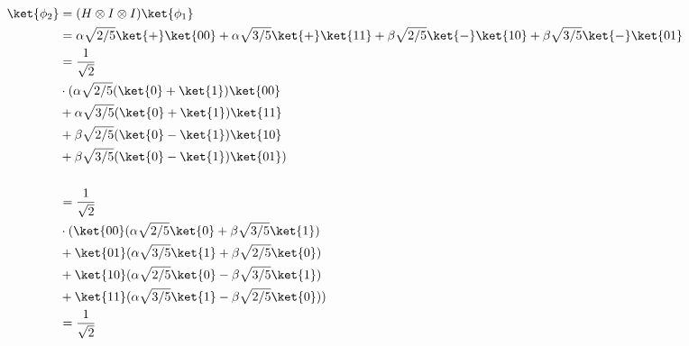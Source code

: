 \documentclass{article}
\begin{document}
\begin{enumerate}
        $$\begin{aligned}
            \ket{\phi_2} & =(H\otimes I\otimes I)\ket{\phi_1}                                                                                             \\
                         & =\alpha\sqrt{2/5}\ket{+}\ket{00}+\alpha\sqrt{3/5}\ket{+}\ket{11}+\beta\sqrt{2/5}\ket{-}\ket{10}+\beta\sqrt{3/5}\ket{-}\ket{01} \\
                         & =\frac{1}{\sqrt{2}}                                                                                                            \\
                         & \cdot(\alpha\sqrt{2/5}(\ket{0}+\ket{1})\ket{00}                                                                                \\
                         & +\alpha\sqrt{3/5}(\ket{0}+\ket{1})\ket{11}                                                                                     \\
                         & +\beta\sqrt{2/5}(\ket{0}-\ket{1})\ket{10}                                                                                      \\
                         & +\beta\sqrt{3/5}(\ket{0}-\ket{1})\ket{01})                                                                                     \\                                                                                                \\
                         & =\frac{1}{\sqrt{2}}                                                                                                            \\
                         & \cdot(\ket{00}(\alpha\sqrt{2/5}\ket{0}+\beta\sqrt{3/5}\ket{1})                                                                 \\
                         & +\ket{01}(\alpha\sqrt{3/5}\ket{1}+\beta\sqrt{2/5}\ket{0})                                                                      \\
                         & +\ket{10}(\alpha\sqrt{2/5}\ket{0}-\beta\sqrt{3/5}\ket{1})                                                                      \\
                         & +\ket{11}(\alpha\sqrt{3/5}\ket{1}-\beta\sqrt{2/5}\ket{0}))                                                                     \\
                         & =\frac{1}{\sqrt{2}}                                                                                                            \\

\end{aligned}$$
\end{enumerate}
\end{document}
